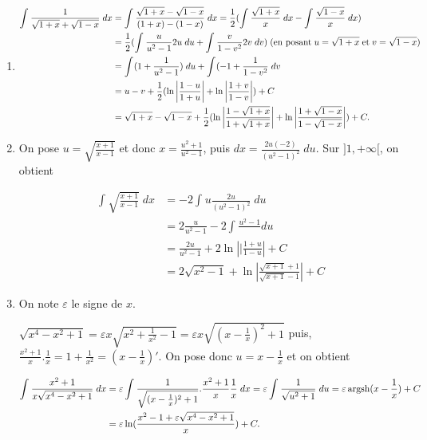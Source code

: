 \documentclass[11pt,a4paper]{article}
\newcommand{\Argsh}{\mathop{\mathrm{argsh}}\nolimits}
\begin{document}
\begin{enumerate}
\item  
\begin{align*}\ensuremath
\int_{}^{}\frac{1}{\sqrt{1+x}+\sqrt{1-x}}\;dx&=\int_{}^{}\frac{\sqrt{1+x}-\sqrt{1-x}}{(1+x)-(1-x)}\;dx
=\frac{1}{2}(\int_{}^{}\frac{\sqrt{1+x}}{x}\;dx-\int_{}^{}\frac{\sqrt{1-x}}{x}\;dx)\\
 &=\frac{1}{2}(\int_{}^{}\frac{u}{u^2-1}2u\;du+\int_{}^{}\frac{v}{1-v^2}2v\;dv)\;(\mbox{en posant}\;u=\sqrt{1+x}\;\mbox{et}\;v=\sqrt{1-x})\\
 &=\int_{}^{}(1+\frac{1}{u^2-1})\;du+\int_{}^{}(-1+\frac{1}{1-v^2}\;dv\\
 &=u-v+\frac{1}{2}(\ln\left|\frac{1-u}{1+u}\right|+\ln\left|\frac{1+v}{1-v}\right|)+C\\
 &=\sqrt{1+x}-\sqrt{1-x}+\frac{1}{2}(\ln\left|\frac{1-\sqrt{1+x}}{1+\sqrt{1+x}}\right|+\ln\left|\frac{1+\sqrt{1-x}}{1-\sqrt{1-x}}\right|)+C.
\end{align*}

\item  On pose $u=\sqrt{\frac{x+1}{x-1}}$ et donc $x=\frac{u^2+1}{u^2-1}$, puis $dx=\frac{2u(-2)}{(u^2-1)^2}\;du$. Sur $]1,+\infty[$, on obtient

\begin{align*}
\int_{}^{}\sqrt{\frac{x+1}{x-1}}\;dx&=-2\int_{}^{}u\frac{2u}{(u^2-1)^2}\;du\\
 &=2\frac{u}{u^2-1}-2\int_{}^{}\frac{u^2-1}\;du\\
 &=\frac{2u}{u^2-1}+2\ln\left||\frac{1+u}{1-u}\right|+C\\
 &=2\sqrt{x^2-1}+\ln\left|\frac{\sqrt{x+1}+1}{\sqrt{x+1}-1}\right|+C
\end{align*}

\item  On note $\varepsilon$ le signe de $x$.

$\sqrt{x^4-x^2+1}=\varepsilon x\sqrt{x^2+\frac{1}{x^2}-1}=\varepsilon x\sqrt{(x-\frac{1}{x})^2+1}$ puis, $\frac{x^2+1}{x}.\frac{1}{x}=1+\frac{1}{x^2}=(x-\frac{1}{x})'$. On pose donc $u=x-\frac{1}{x}$ et on obtient

\begin{align*}\ensuremath
\int_{}^{}\frac{x^2+1}{x\sqrt{x^4-x^2+1}}\;dx&=\varepsilon\int_{}^{}\frac{1}{\sqrt{(x-\frac{1}{x})^2+1}}.\frac{x^2+1}{x}\frac{1}{x}\;dx
=\varepsilon\int_{}^{}\frac{1}{\sqrt{u^2+1}}\;du=\varepsilon\Argsh(x-\frac{1}{x})+C\\
 &=\varepsilon\ln(\frac{x^2-1+\varepsilon\sqrt{x^4-x^2+1}}{x})+C.
\end{align*}


\end{enumerate}
\end{document}
